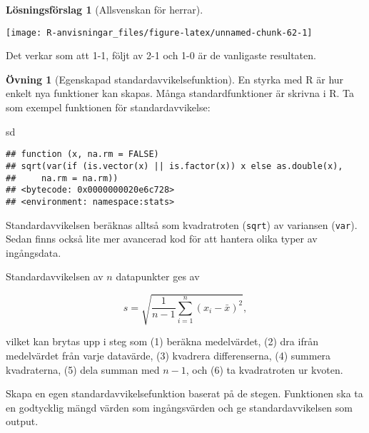 \documentclass[
]{book}
\newenvironment{Shaded}{\begin{snugshade}}{\end{snugshade}}
\newcommand{\NormalTok}[1]{#1}
\theoremstyle{definition}
\theoremstyle{definition}
\theoremstyle{definition}
\newtheorem{exercise}{Övning}[chapter]
\theoremstyle{definition}
\newtheorem{hypothesis}{Lösningsförslag}[chapter]
\theoremstyle{remark}
\begin{document}
\begin{hypothesis}[Allsvenskan för herrar]
\begin{center}\texttt{[image: R-anvisningar\_files/figure-latex/unnamed-chunk-62-1]} \end{center}

Det verkar som att 1-1, följt av 2-1 och 1-0 är de vanligaste resultaten.
\end{hypothesis}

\begin{exercise}[Egenskapad standardavvikelsefunktion]
En styrka med R är hur enkelt nya funktioner kan skapas. Många standardfunktioner är skrivna i R. Ta som exempel funktionen för standardavvikelse:

\begin{Shaded}
\begin{Highlighting}[]
\NormalTok{sd}
\end{Highlighting}
\end{Shaded}

\begin{verbatim}
## function (x, na.rm = FALSE) 
## sqrt(var(if (is.vector(x) || is.factor(x)) x else as.double(x), 
##     na.rm = na.rm))
## <bytecode: 0x0000000020e6c728>
## <environment: namespace:stats>
\end{verbatim}

Standardavvikelsen beräknas alltså som kvadratroten (\texttt{sqrt}) av variansen (\texttt{var}). Sedan finns också lite mer avancerad kod för att hantera olika typer av ingångsdata.

Standardavvikelsen av \(n\) datapunkter ges av

\[s = \sqrt{\frac{1}{n-1}\sum_{i=1}^n (x_i - \bar x)^2},\]

vilket kan brytas upp i steg som (1) beräkna medelvärdet, (2) dra ifrån medelvärdet från varje datavärde, (3) kvadrera differenserna, (4) summera kvadraterna, (5) dela summan med \(n-1\), och (6) ta kvadratroten ur kvoten.

Skapa en egen standardavvikelsefunktion baserat på de stegen. Funktionen ska ta en godtycklig mängd värden som ingångsvärden och ge standardavvikelsen som output.
\end{exercise}
\end{document}
